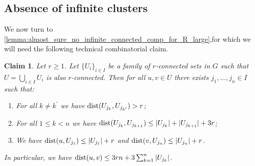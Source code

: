 \documentclass[11pt, reqno]{article}
\newtheorem{claim}[thm]{Claim}
\numberwithin{equation}{section}
\theoremstyle{definition}
\newcommand{\1}{\mathds{1}}
\begin{document}
\subsection{Absence of infinite clusters}

We now turn to \cref{lemma:almost_sure_no_infinite_connected_comp_for_R_large},for which we will need the following technical combinatorial claim. 
\begin{claim}
    \label{claim:maximal_shortest_path}
    Let $r\ge 1$. Let $\{U_i\}_{i\in I}$ be a family of $r$-connected sets in $G$ such that $U=\bigcup_{i\in I} U_i$ is also $r$-connected. Then for all $u,v\in U$ there exists ${j_1},\ldots,{j_n}\in I$ such that:
    \begin{enumerate}
        \item[{\normalfont (1)}] For all $k\not=k^\prime$ we have $\text{\normalfont dist}(U_{j_k},U_{j_{k^\prime}}) > r$;
        \item[{\normalfont (2)}] For all $1\le k < n$ we have $\text{\normalfont dist}(U_{j_k},U_{j_{k+1}}) \le  |U_{j_{k}}| + |U_{j_{k+1}}| + 3r $;
        \item[{\normalfont (3)}] We have $\text{\normalfont dist}(u,U_{j_{1}}) \le |U_{j_1}| + r$ and $\text{\normalfont dist}(v,U_{j_{n}}) \le |U_{j_n}| + r$. 
    \end{enumerate}
    In particular, we have $\text{\normalfont dist}(u,v) \le 3rn + 3\sum_{k=1}^{n} |U_{j_k}|$. 
    \end{claim}
\end{document}
